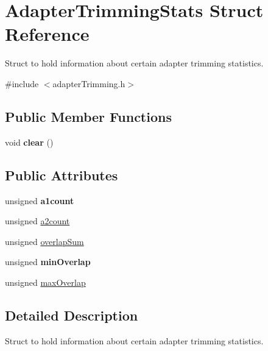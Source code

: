 \hypertarget{struct_adapter_trimming_stats}{\section{Adapter\-Trimming\-Stats Struct Reference}
\label{struct_adapter_trimming_stats}
}


Struct to hold information about certain adapter trimming statistics.  




{\ttfamily \#include $<$adapter\-Trimming.\-h$>$}

\subsection*{Public Member Functions}
\begin{DoxyCompactItemize}
\item 
\hypertarget{struct_adapter_trimming_stats_aba2db4f8bdfbf1f9d389bf20a752b8f3}{void {\bfseries clear} ()}\label{struct_adapter_trimming_stats_aba2db4f8bdfbf1f9d389bf20a752b8f3}

\end{DoxyCompactItemize}
\subsection*{Public Attributes}
\begin{DoxyCompactItemize}
\item 
\hypertarget{struct_adapter_trimming_stats_ac2e7c09b2e9b8a080afb148c6f8d4026}{unsigned {\bfseries a1count}}\label{struct_adapter_trimming_stats_ac2e7c09b2e9b8a080afb148c6f8d4026}

\item 
unsigned \hyperlink{struct_adapter_trimming_stats_aabec417e43e59c829ab9172399c2961f}{a2count}
\item 
unsigned \hyperlink{struct_adapter_trimming_stats_a1a223cef64dde7c1a3eb5f7a8da182b5}{overlap\-Sum}
\item 
\hypertarget{struct_adapter_trimming_stats_ac893758e439beec68892ce129b16bc82}{unsigned {\bfseries min\-Overlap}}\label{struct_adapter_trimming_stats_ac893758e439beec68892ce129b16bc82}

\item 
unsigned \hyperlink{struct_adapter_trimming_stats_a3a8e65c4bb3dbd65a51289d07699ad11}{max\-Overlap}
\end{DoxyCompactItemize}


\subsection{Detailed Description}
Struct to hold information about certain adapter trimming statistics. 


